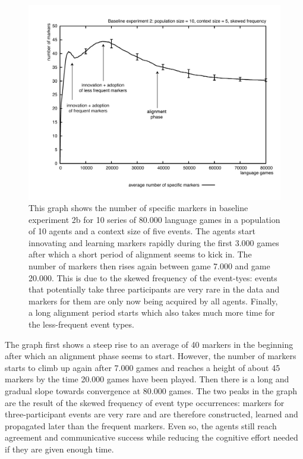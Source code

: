 \begin{figure} [p]
\centerline{\includegraphics[width=\textwidth]{Chapter3/figs/graph-base2-size1}}
  \caption[Baseline experiment 2: number of markers (skewed frequency)]{This graph shows the number of specific markers in baseline experiment 2b for 10 series of 80.000 language games in a population of 10 agents and a context size of five events. The agents start innovating and learning markers rapidly during the first 3.000 games after which a short period of alignment seems to kick in. The number of markers then rises again between game 7.000 and game 20.000. This is due to the skewed frequency of the event-tyes: events that potentially take three participants are very rare in the data and markers for them are only now being acquired by all agents. Finally, a long alignment period starts which also takes much more time for the less-frequent event types.}
   \label{f:base2-size1}
\end{figure}

The graph first shows a steep rise to an average of 40 markers in the beginning after which an alignment phase seems to start. However, the number of markers starts to climb up again after 7.000 games and reaches a height of about 45 markers by the time 20.000 games have been played. Then there is a long and gradual slope towards convergence at 80.000 games. The two peaks in the graph are the result of the skewed frequency of event type occurrences: markers for three-participant events are very rare and are therefore constructed, learned and propagated later than the frequent markers. Even so, the agents still reach agreement and communicative success while reducing the cognitive effort needed if they are given enough time.

